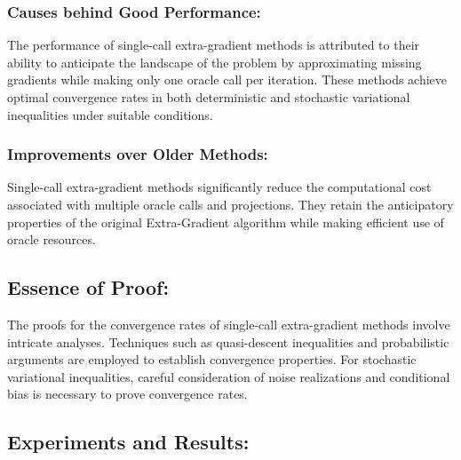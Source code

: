 \documentclass[11pt]{article}
\begin{document}
		\subsubsection{Causes behind Good Performance: }
  
        The performance of single-call extra-gradient methods is attributed to their ability to anticipate the landscape of the problem by approximating missing gradients while making only one oracle call per iteration. These methods achieve optimal convergence rates in both deterministic and stochastic variational inequalities under suitable conditions.
		
		\subsubsection{Improvements over Older Methods: }
  
        Single-call extra-gradient methods significantly reduce the computational cost associated with multiple oracle calls and projections. They retain the anticipatory properties of the original Extra-Gradient algorithm while making efficient use of oracle resources.
	
	\subsection{Essence of Proof: }
        
        The proofs for the convergence rates of single-call extra-gradient methods involve intricate analyses. Techniques such as quasi-descent inequalities and probabilistic arguments are employed to establish convergence properties. For stochastic variational inequalities, careful consideration of noise realizations and conditional bias is necessary to prove convergence rates.
	
	\subsection{Experiments and Results:}
 
\end{document}
